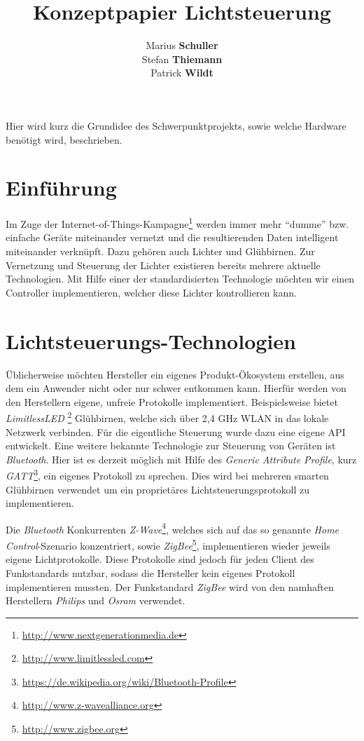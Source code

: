 \documentclass[a4paper,12pt]{article}
\begin{document}
\title{Konzeptpapier Lichtsteuerung}
\author{Marius \textbf{Schuller}\\
        Stefan \textbf{Thiemann}\\
		Patrick \textbf{Wildt}}
\maketitle

\tableofcontents

\newpage

\noindent
Hier wird kurz die Grundidee des Schwerpunktprojekts, sowie welche Hardware 
benötigt wird, beschrieben.

\section{Einführung}

Im Zuge der Internet-of-Things-Kampagne\footnote{\url{http://www.nextgenerationmedia.de}}
werden immer mehr ``dumme'' bzw. einfache Geräte miteinander vernetzt und die
resultierenden Daten intelligent miteinander verknüpft. Dazu gehören auch Lichter und
Glühbirnen. Zur Vernetzung und Steuerung der Lichter existieren bereits mehrere
aktuelle Technologien. Mit Hilfe einer der standardisierten Technologie möchten wir
einen Controller implementieren, welcher diese Lichter kontrollieren kann.

\section{Lichtsteuerungs-Technologien}

Üblicherweise möchten Hersteller ein eigenes Produkt-Ökosystem erstellen, aus dem ein
Anwender nicht oder nur schwer entkommen kann. Hierfür werden von den Herstellern
eigene, unfreie Protokolle implementiert. Beispielsweise bietet \textit{LimitlessLED}
\footnote{\url{http://www.limitlessled.com}} Glühbirnen, welche sich
über 2,4 GHz WLAN in das lokale Netzwerk verbinden. Für die eigentliche
Steuerung wurde dazu eine eigene API entwickelt. Eine weitere bekannte Technologie
zur Steuerung von Geräten ist \textit{Bluetooth}. Hier ist es derzeit möglich
mit Hilfe des \textit{Generic Attribute Profile}, kurz
\textit{GATT}\footnote{\url{https://de.wikipedia.org/wiki/Bluetooth-Profile}},
ein eigenes Protokoll zu sprechen. Dies wird bei mehreren smarten Glühbirnen
verwendet um ein proprietäres Lichtsteuerungsprotokoll zu implementieren.

Die \textit{Bluetooth} Konkurrenten
\textit{Z-Wave}\footnote{\url{http://www.z-wavealliance.org}}, welches sich auf das
so genannte \textit{Home Control}-Szenario konzentriert, sowie
\textit{ZigBee}\footnote{\url{http://www.zigbee.org}},
implementieren wieder jeweils eigene Lichtprotokolle. Diese Protokolle sind jedoch
für jeden Client des Funkstandards nutzbar, sodass die Hersteller kein
eigenes Protokoll implementieren mussten. Der Funkstandard \textit{ZigBee} wird
von den namhaften Herstellern \textit{Philips} und \textit{Osram} verwendet.
\end{document}
